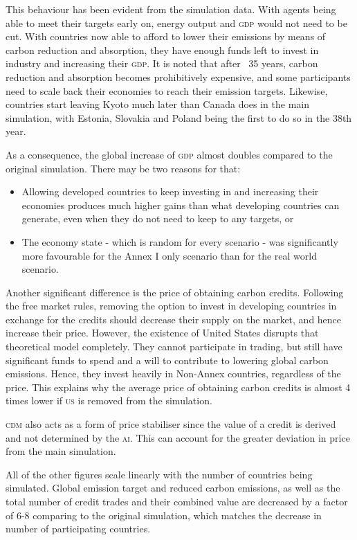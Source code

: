 This behaviour has been evident from the simulation data. With agents being able to meet their targets early on, energy output and \textsc{gdp} would not need to be cut. With countries now able to afford to lower their emissions by means of carbon reduction and absorption, they have enough funds left to invest in industry and increasing their \textsc{gdp}. It is noted that after ~35 years, carbon reduction and absorption becomes prohibitively expensive, and some participants need to scale back their economies to reach their emission targets. Likewise, countries start leaving Kyoto much later than Canada does in the main simulation, with Estonia, Slovakia and Poland being the first to do so in the 38th year.

As a consequence, the global increase of \textsc{gdp} almost doubles compared to the original simulation. There may be two reasons for that:

\begin{itemize}
	\item Allowing developed countries to keep investing in and increasing their economies produces much higher gains than what developing countries can generate, even when they do not need to keep to any targets, or 

	\item The economy state - which is random for every scenario - was significantly more favourable for the Annex I only scenario than for the real world scenario.
\end{itemize}

Another significant difference is the price of obtaining carbon credits. Following the free market rules, removing the option to invest in developing countries in exchange for the credits should decrease their supply on the market, and hence increase their price. However, the existence of United States disrupts that theoretical model completely. They cannot participate in trading, but still have significant funds to spend and a will to contribute to lowering global carbon emissions. Hence, they invest heavily in Non-Annex countries, regardless of the price. This explains why the average price of obtaining carbon credits is almost 4 times lower if \textsc{us} is removed from the simulation.

\textsc{cdm} also acts as a form of price stabiliser since the value of a credit is derived and not determined by the \textsc{ai}.  This can account for the greater deviation in price from the main simulation.

All of the other figures scale linearly with the number of countries being simulated. Global emission target and reduced carbon emissions, as well as the total number of credit trades and their combined value are decreased by a factor of 6-8 comparing to the original simulation, which matches the decrease in number of participating countries.

